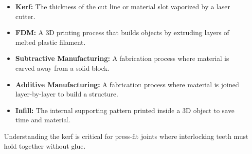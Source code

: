 \documentclass[12pt,a4paper]{article}
\begin{document}
\begin{tcolorbox}[defbox, title={\textbf{One-Line Definitions}}]
\begin{itemize}[leftmargin=*, itemsep=3pt, topsep=0pt]
  \item \textbf{Kerf:} The thickness of the cut line or material slot vaporized by a laser cutter.
  \item \textbf{FDM:} A 3D printing process that builds objects by extruding layers of melted plastic filament.
  \item \textbf{Subtractive Manufacturing:} A fabrication process where material is carved away from a solid block.
  \item \textbf{Additive Manufacturing:} A fabrication process where material is joined layer-by-layer to build a structure.
  \item \textbf{Infill:} The internal supporting pattern printed inside a 3D object to save time and material.
\end{itemize}
\tcblower
Understanding the kerf is critical for press-fit joints where interlocking teeth must hold together without glue.
\end{tcolorbox}

\vspace{6pt}
\end{document}
